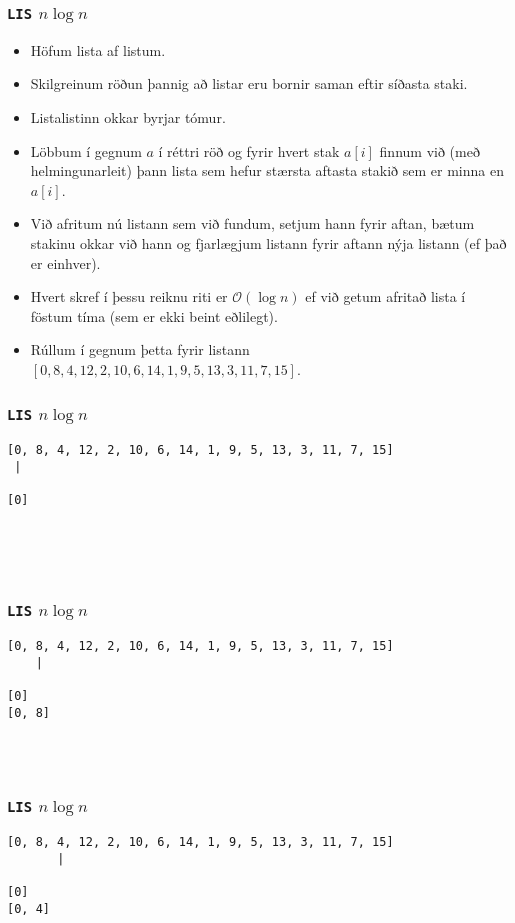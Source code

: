 \documentclass{beamer}
\begin{document}
\begin{frame}
	\frametitle{\texttt{LIS} $n\log n$}
	\begin{itemize}
		\item<1-> Höfum lista af listum.
		\item<2-> Skilgreinum röðun þannig að listar eru bornir saman eftir síðasta staki.
		\item<3-> Listalistinn okkar byrjar tómur.
		\item<4-> Löbbum í gegnum $a$ í réttri röð og fyrir hvert stak $a[i]$ finnum við (með helmingunarleit)
			þann lista sem hefur stærsta aftasta stakið sem er minna en $a[i]$.
		\item<5-> Við afritum nú listann sem við fundum, setjum hann fyrir aftan, bætum stakinu okkar við hann
			og fjarlægjum listann fyrir aftann nýja listann (ef það er einhver).
		\item<6-> Hvert skref í þessu reiknu riti er $\mathcal{O}(\log n)$ ef við getum afritað lista
			í föstum tíma (sem er ekki beint eðlilegt).
		\item<7-> Rúllum í gegnum þetta fyrir listann $[0, 8, 4, 12, 2, 10, 6, 14, 1, 9, 5, 13, 3, 11, 7, 15]$.
	\end{itemize}
\end{frame}

\begin{frame}[fragile]
	\frametitle{\texttt{LIS} $n\log n$}
\begin{verbatim}
[0, 8, 4, 12, 2, 10, 6, 14, 1, 9, 5, 13, 3, 11, 7, 15]
 |

[0]





\end{verbatim}
\end{frame}
\addtocounter{framenumber}{-1}

\begin{frame}[fragile]
	\frametitle{\texttt{LIS} $n\log n$}
\begin{verbatim}
[0, 8, 4, 12, 2, 10, 6, 14, 1, 9, 5, 13, 3, 11, 7, 15]
    |

[0]
[0, 8]




\end{verbatim}
\end{frame}
\addtocounter{framenumber}{-1}

\begin{frame}[fragile]
	\frametitle{\texttt{LIS} $n\log n$}
\begin{verbatim}
[0, 8, 4, 12, 2, 10, 6, 14, 1, 9, 5, 13, 3, 11, 7, 15]
       |

[0]
[0, 4]




\end{verbatim}
\end{frame}
\addtocounter{framenumber}{-1}
\end{document}
